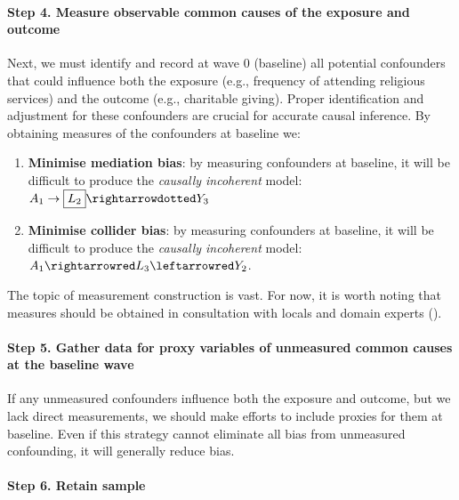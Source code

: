 \documentclass[
  singlecolumn]{article}
\let\oldparagraph\paragraph
\renewcommand{\paragraph}[1]{\oldparagraph{#1}\mbox{}}
\begin{document}
\paragraph{Step 4. Measure observable common causes of the exposure and
outcome}\label{step-4.-measure-observable-common-causes-of-the-exposure-and-outcome}

Next, we must identify and record at wave 0 (baseline) all potential
confounders that could influence both the exposure (e.g., frequency of
attending religious services) and the outcome (e.g., charitable giving).
Proper identification and adjustment for these confounders are crucial
for accurate causal inference. By obtaining measures of the confounders
at baseline we:

\begin{enumerate}
\def\labelenumi{\alph{enumi}.}
\item
  \textbf{Minimise mediation bias}: by measuring confounders at
  baseline, it will be difficult to produce the \emph{causally
  incoherent} model: \(A_1\to \boxed{L_2} \rightarrowdotted Y_3\)
\item
  \textbf{Minimise collider bias}: by measuring confounders at baseline,
  it will be difficult to produce the \emph{causally incoherent} model:
  \(A_1\rightarrowred L_3 \leftarrowred Y_2\).
\end{enumerate}

The topic of measurement construction is vast. For now, it is worth
noting that measures should be obtained in consultation with locals and
domain experts ().

\paragraph{Step 5. Gather data for proxy variables of unmeasured common
causes at the baseline
wave}\label{step-5.-gather-data-for-proxy-variables-of-unmeasured-common-causes-at-the-baseline-wave}

If any unmeasured confounders influence both the exposure and outcome,
but we lack direct measurements, we should make efforts to include
proxies for them at baseline. Even if this strategy cannot eliminate all
bias from unmeasured confounding, it will generally reduce bias.

\paragraph{Step 6. Retain sample}\label{step-6.-retain-sample}
\end{document}
